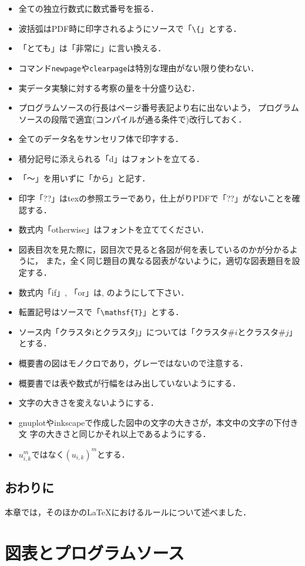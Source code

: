 \documentclass[a4j,12pt,dvipdfmx,oneside]{jsbook}
\theoremstyle{definition}
\begin{document}
\begin{itemize}
\item 全ての独立行数式に数式番号を振る．
\item 波括弧はPDF時に印字されるようにソースで「\texttt{\textbackslash\{}」とする．
\item 「とても」は「非常に」に言い換える．
\item コマンド\texttt{newpage}や\texttt{clearpage}は特別な理由がない限り使わない．
\item 実データ実験に対する考察の量を十分盛り込む．
\item プログラムソースの行長はページ番号表記より右に出ないよう，
プログラムソースの段階で適宜(コンパイルが通る条件で)改行しておく．
\item 全てのデータ名をサンセリフ体で印字する．
\item 積分記号に添えられる「d」はフォントを立てる．
\item 「～」を用いずに「から」と記す．
\item 印字「??」はtexの参照エラーであり，仕上がりPDFで「??」がないことを確認する．
\item 数式内「otherwise」はフォントを立ててください．
\item 図表目次を見た際に，図目次で見ると各図が何を表しているのかが分かるように，
また，全く同じ題目の異なる図表がないように，適切な図表題目を設定する．
\item 数式内「if」, 「or」は, のようにして下さい．
\item 転置記号はソースで「\texttt{\textbackslash{}mathsf\{T\}}」とする．
\item ソース内「クラスタiとクラスタj」については「クラスタ$\#i$とクラスタ$\#j$」とする．
\item 概要書の図はモノクロであり，グレーではないので注意する．
\item 概要書では表や数式が行幅をはみ出していないようにする．
\item 文字の大きさを変えないようにする．
\item gnuplotやinkscapeで作成した図中の文字の大きさが，本文中の文字の下付き文
字の大きさと同じかそれ以上であるようにする．
\item $u_{i,k}^m$ではなく$(u_{i,k})^m$とする．
\end{itemize}
%
%
%
\section{おわりに}\label{sec:latex-rule_summary}
本章では，そのほかの\LaTeX{}におけるルールについて述べました．
%
%
%
\chapter{図表とプログラムソース}\label{chap:multimedia}
%
%
%
\end{document}
